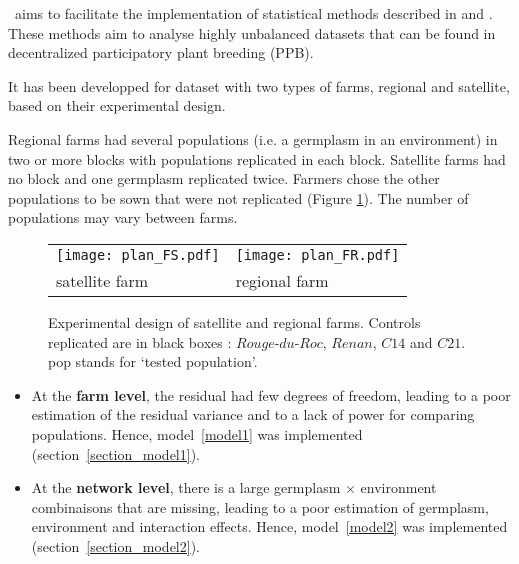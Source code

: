 \pack~aims to facilitate the implementation of statistical methods described in \citet{riviere_hierarchical_2015} and \citet{riviere_hierarchical_2015-1}.
These methods aim to analyse highly unbalanced datasets that can be found in decentralized participatory plant breeding (PPB).

It has been developped for dataset with two types of farms, regional and satellite, based on their experimental design.

Regional farms had several populations (i.e. a germplasm in an environment) in two or more blocks with populations replicated in each block.
Satellite farms had no block and one germplasm replicated twice.
Farmers chose the other populations to be sown that were not replicated (Figure \ref{plan_SF_RF}).
The number of populations may vary between farms.

\begin{figure}[H]
        \begin{center}
                \begin{tabular}{|m{}|m{}|}
                        \hline
                        \texttt{[image: plan\_FS.pdf]}
                        &
                        \vspace{.5cm}\texttt{[image: plan\_FR.pdf]} \\
                        satellite farm & regional farm \\
                        \hline
                \end{tabular}

                \caption{Experimental design of satellite and regional farms. Controls replicated are in black boxes : $Rouge$-$du$-$Roc$, $Renan$, $C14$ and $C21$. pop stands for `tested population'.}
                \label{plan_SF_RF}
        \end{center}
\end{figure}

\begin{itemize}
\item At the \textbf{farm level}, the residual had few degrees of freedom, leading to a poor estimation of the residual variance and to a lack of power for comparing populations.
Hence, model~\ref{model1} was implemented (section~\ref{section_model1}).

\item At the \textbf{network level}, there is a large germplasm $\times$ environment combinaisons that are missing, leading to a poor estimation of germplasm, environment and interaction effects.
Hence, model~\ref{model2} was implemented (section~\ref{section_model2}).

\end{itemize}

